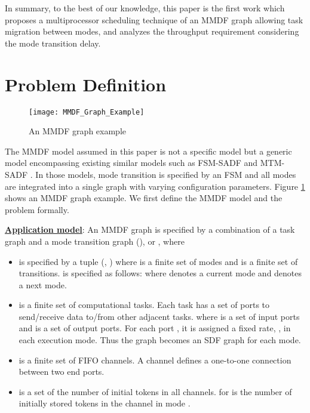 \documentclass[prodmode,acmtecs]{acmsmall}
\begin{document}
In summary, to the best of our knowledge, this paper is the first work which proposes a multiprocessor scheduling technique of an MMDF graph allowing task migration between modes, and analyzes the throughput requirement considering the mode transition delay.

\section{Problem Definition}
\label{Section:Problem Definition}

\begin{figure} [ht]
\centerline{\texttt{[image: MMDF\_Graph\_Example]}}
\caption{An MMDF graph example}
\label{Figure:MMDF Graph Example}
\end{figure}

The MMDF model assumed in this paper is not a specific model but a generic model encompassing existing similar models such as FSM-SADF \cite{Stuijk:2008} and MTM-SADF \cite{Jung:2014}. In those models, mode transition is specified by an FSM and all modes are integrated into a single graph with varying configuration parameters. Figure \ref{Figure:MMDF Graph Example} shows an MMDF graph example. We first define the MMDF model and the problem formally.

\vspace{0.3cm}

\textbf{\underline{Application model}}: An MMDF graph is specified by a combination of a task graph and a mode transition graph (), or , where

\begin{itemize}
  \item  is specified by a tuple (, ) where  is a finite set of modes and  is a finite set of transitions.  is specified as follows:  where  denotes a current mode and  denotes a next mode.
  \vspace{0.2cm}
  \item  is a finite set of computational tasks. Each task  has a set of ports  to send/receive data to/from other adjacent tasks.  where  is a set of input ports and  is a set of output ports. For each port , it is assigned a fixed rate, , in each execution mode. Thus the graph becomes an SDF graph for each mode.
  \vspace{0.2cm}
  \item  is a finite set of FIFO channels. A channel defines a one-to-one connection between two end ports.
  \vspace{0.2cm}
  \item  is a set of the number of initial tokens in all channels.  for  is the number of initially stored tokens in the channel  in mode .
\end{itemize}
\end{document}

